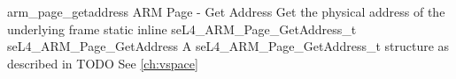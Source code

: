 %
%
%
%

\apidoc
{arm_page_getaddress}
{ARM Page - Get Address}
{Get the physical address of the underlying frame}
{static inline seL4\_ARM\_Page\_GetAddress\_t seL4\_ARM\_Page\_GetAddress}
{
}
{A seL4\_ARM\_Page\_GetAddress\_t structure as described in TODO}
{See \autoref{ch:vspace}}
